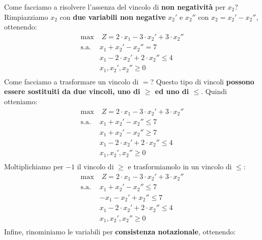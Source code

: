 \documentclass[12pt]{article}
\begin{document}
Come facciamo a risolvere l'assenza del vincolo di \textbf{non negatività} per $x_2$?
Rimpiazziamo $x_2$ con \textbf{due variabili non negative} $x_2'$ e $x_2''$ con $x_2 = x_2' - x_2''$, ottenendo:
\begin{equation*}
    \begin{array}{ll}
        \displaystyle \textrm{max} & \; Z = 2 \cdot x_1 - 3 \cdot x_2' + 3\cdot x_2''\\
        \textrm{s.a.} & x_1 + x_2' - x_2''= 7\\
        \phantom{} & x_1 - 2 \cdot x_2' + 2 \cdot x_2'' \leq 4\\
        \phantom{} & x_1, x_2', x_2'' \geq 0 \\
    \end{array}
\end{equation*}
Come facciamo a trasformare un vincolo di $=$? Questo tipo di vincoli \textbf{possono essere sostituiti da due vincoli, uno di $\geq$ ed uno di $\leq$}.
Quindi otteniamo:
\begin{equation*}
    \begin{array}{ll}
        \displaystyle \textrm{max} & \; Z = 2 \cdot x_1 - 3 \cdot x_2' + 3\cdot x_2''\\
        \textrm{s.a.} & x_1 + x_2' - x_2'' \leq 7\\
        \phantom{} & x_1 + x_2' - x_2 '' \geq 7 \\
        \phantom{} & x_1 - 2 \cdot x_2' + 2 \cdot x_2'' \leq 4\\
        \phantom{} & x_1, x_2', x_2'' \geq 0 \\
    \end{array}
\end{equation*}
Moltiplichiamo per $-1$ il vincolo di $\geq$ e trasformiamolo in un vincolo di $\leq$:
\begin{equation*}
    \begin{array}{ll}
        \displaystyle \textrm{max} & \; Z = 2 \cdot x_1 - 3 \cdot x_2' + 3\cdot x_2''\\
        \textrm{s.a.} & x_1 + x_2' - x_2''\leq 7\\
        \phantom{} & -x_1 - x_2' + x_2 '' \leq 7 \\
        \phantom{} & x_1 - 2 \cdot x_2' + 2\cdot x_2'' \leq 4\\
        \phantom{} & x_1, x_2', x_2'' \geq 0 \\
    \end{array}
\end{equation*}
Infine, rinominiamo le variabili per \textbf{consistenza notazionale}, ottenendo:
\end{document}
